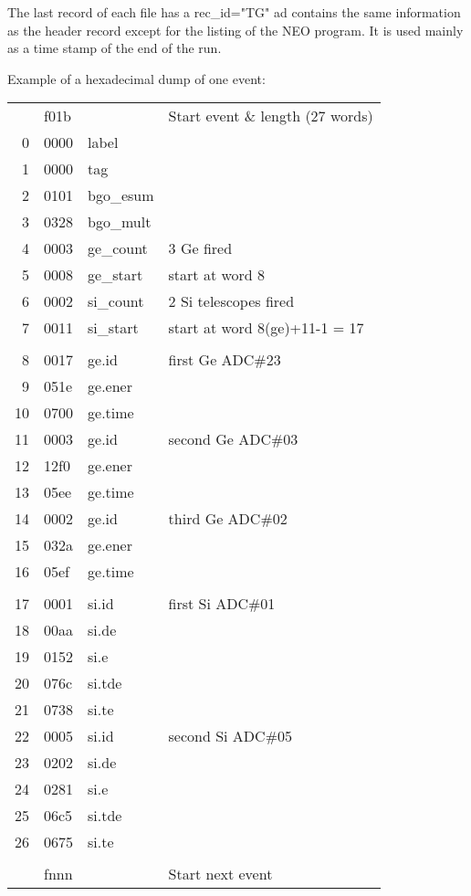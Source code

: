 \bigskip
\bigskip
\bigskip
The last record of each file has a rec\_id="TG" ad contains the same
information as the header record except for the listing of the NEO program. It
is used mainly as a time stamp of the end of the run.

\newpage
Example of a hexadecimal dump of one event:
\begin{center}
\begin{tabular}{llll}
    & f01b &            & Start event \& length (27 words) 	\\
 ~0 & 0000 & label	& 					\\
 ~1 & 0000 & tag	& 					\\
 ~2 & 0101 & bgo\_esum	& 					\\
 ~3 & 0328 & bgo\_mult	& 					\\
 ~4 & 0003 & ge\_count	& 3 Ge fired				\\
 ~5 & 0008 & ge\_start	& start at word 8			\\
 ~6 & 0002 & si\_count	& 2 Si telescopes fired			\\
 ~7 & 0011 & si\_start  & start at word 8(ge)+11-1 = 17		\\
    &      &            &  					\\
 ~8 & 0017 & ge.id	& first Ge ADC\#23			\\
 ~9 & 051e & ge.ener	& 					\\
 10 & 0700 & ge.time  	& 					\\
 11 & 0003 & ge.id	& second Ge ADC\#03			\\
 12 & 12f0 & ge.ener	&					\\
 13 & 05ee & ge.time	& 					\\
 14 & 0002 & ge.id	& third Ge ADC\#02			\\
 15 & 032a & ge.ener	&					\\
 16 & 05ef & ge.time 	& 					\\
    &      &            &  					\\
 17 & 0001 & si.id	& first Si ADC\#01			\\
 18 & 00aa & si.de 	& 					\\
 19 & 0152 & si.e	& 					\\
 20 & 076c & si.tde	& 					\\
 21 & 0738 & si.te	& 					\\
 22 & 0005 & si.id	& second Si ADC\#05			\\
 23 & 0202 & si.de	& 					\\
 24 & 0281 & si.e	& 					\\
 25 & 06c5 & si.tde	& 					\\
 26 & 0675 & si.te	& 					\\
    &      &            &  					\\
    & fnnn &            & Start next event 		 	\\
\end{tabular}
\end{center}
 


